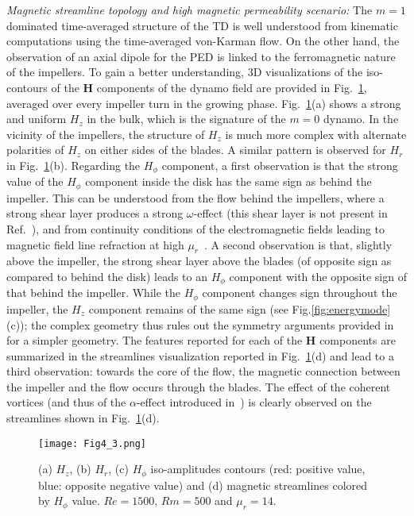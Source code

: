 \documentclass[aps,prl,twocolumn,showpacs,amsmath,amssymb]{revtex4-1}%
\begin{document}
\textit{Magnetic streamline topology and high magnetic permeability scenario: }\label{sec:topology}
The $m=1$ dominated time-averaged structure of the TD  is well understood from kinematic computations using the time-averaged von-Karman flow. On the other hand, the observation of an axial dipole for the PED is linked to the ferromagnetic nature of the impellers. 
To gain a better understanding, 3D visualizations of the iso-contours of the $\mathbf{H}$ components of the dynamo field are provided in Fig.~\ref{fig:3Dvisu}, averaged over every impeller turn in the growing phase. Fig.~\ref{fig:3Dvisu}(a) shows a strong and uniform $H_z$ in the bulk, which is the signature of the $m=0$ dynamo. In the vicinity of the impellers, the structure of $H_z$ is much more complex  with alternate polarities of $H_z$ on either sides of the blades. A similar pattern is observed for $H_r$ in Fig.~\ref{fig:3Dvisu}(b). Regarding the $H_\phi$ component, a first observation is  that  the strong value of the $H_\phi$ component inside the disk has the same sign as behind the impeller. This can be understood from the flow behind the impellers, where a strong shear layer produces a strong $\omega$-effect (this shear layer is not present in Ref.~\cite{nore_direct_2016}), and from continuity conditions of the electromagnetic fields leading to magnetic field line refraction at high  $\mu_r$~\cite{paper:giesecke:2010,paper:giesecke:2012,nore_direct_2016}. 
A second observation is that, slightly above the impeller, the strong shear layer above the blades (of opposite sign as compared to behind the disk) leads to an $H_\phi$ component with the opposite sign of that behind the impeller. While the $H_\phi$ component changes sign throughout the impeller, the $H_z$ component remains of the same sign (see Fig.\ref{fig:energymode}(c)); the complex geometry thus rules out the symmetry arguments provided in~\cite{herault_optimum_2014} for a simpler geometry. 
The features reported for each of the $\mathbf{H}$ components are summarized in the streamlines visualization reported in Fig.~\ref{fig:3Dvisu}(d) and lead to a third observation:  towards the core of the flow, the magnetic connection between the impeller and the flow occurs through the blades.
The effect of the coherent vortices (and thus of the $\alpha$-effect introduced in~\cite{paper:petrelis:2007}) is clearly observed on the streamlines shown in Fig.~\ref{fig:3Dvisu}(d).

\begin{figure}
\texttt{[image: Fig4\_3.png]}
\caption{(a) $H_z$, (b) $H_r$, (c) $H_\phi$ iso-amplitudes contours (red: positive value, blue: opposite negative value) and (d) magnetic streamlines colored by $H_\phi$ value. $Re=1500$, $Rm=500$ and $\mu_r=14$.}
\label{fig:3Dvisu}
\end{figure}
\end{document}

